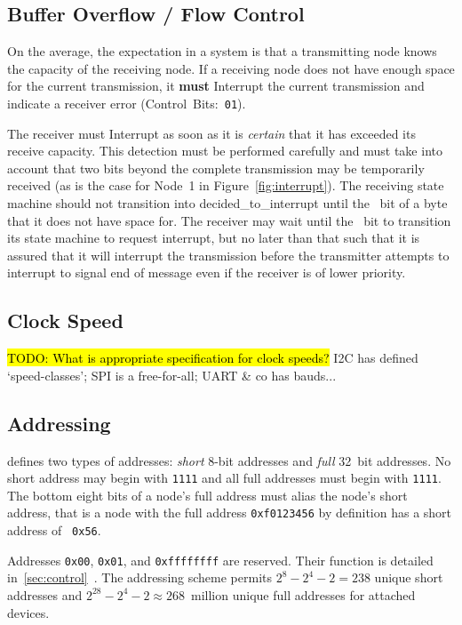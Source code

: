 \subsection{Buffer Overflow / Flow Control}
On the average, the expectation in a \bus system is that a transmitting node
knows the capacity of the receiving node. If a receiving node does not have
enough space for the current transmission, it {\bf must} Interrupt the current
transmission and indicate a receiver error (Control~Bits:~{\tt 01}).

The receiver must Interrupt as soon as it is {\em certain} that it has
exceeded its receive capacity. This detection must be performed carefully and
must take into account that two bits beyond the complete transmission may be
temporarily received (as is the case for Node~1 in
Figure~\ref{fig:interrupt}). The receiving state machine should not transition
into {\sc decided\_to\_interrupt} until the ~bit of a byte that it does
not have space for. The receiver may wait until the ~bit to transition
its state machine to request interrupt, but no later than that such that it is
assured that it will interrupt the transmission before the transmitter
attempts to interrupt to signal end of message even if the receiver is of
lower priority.

\subsection{Clock Speed}
\hl{TODO: What is appropriate specification for clock speeds?} I2C has defined
`speed-classes'; SPI is a free-for-all; UART \& co has bauds...

\subsection{Addressing}
\label{sec:spec-address}
\bus defines two types of addresses: \textit{short} 8-bit addresses and
\textit{full} 32~bit addresses. No short address may begin with {\tt 1111} and
all full addresses must begin with {\tt 1111}.  The bottom eight bits of a
node's full address must alias the node's short address, that is a node with
the full address {\tt 0xf0123456} by definition has a short address of {\tt
0x56}.

Addresses {\tt 0x00}, {\tt 0x01}, and {\tt 0xffffffff} are reserved. Their
function is detailed in~\ref{sec:control}~. The \bus
addressing scheme permits $2^8 - 2^4 - 2 = 238$ unique short addresses and
$2^{28} - 2^4 - 2 \approx 268$~million unique full addresses for attached
devices.


